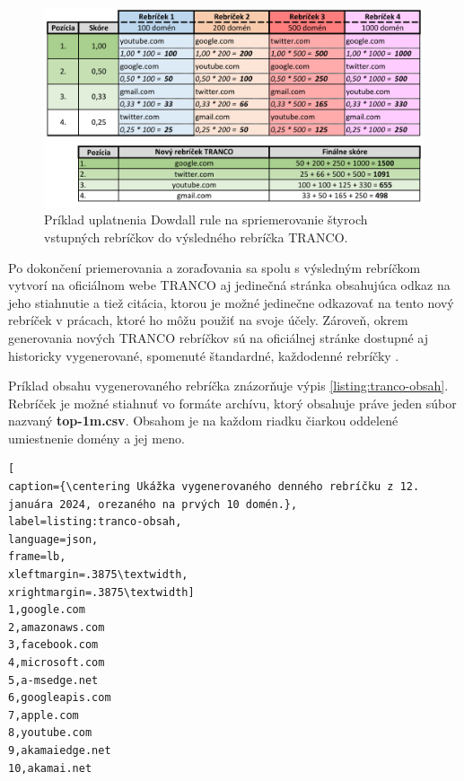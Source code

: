 \begin{figure}[htb]
\begin{center}
 \includegraphics[scale=0.84]{obrazky-figures/dowdall_rule_size_fit_cropped.pdf}
 \caption{\centering Príklad uplatnenia Dowdall rule na spriemerovanie štyroch vstupných rebríčkov do výsledného rebríčka TRANCO.}
 \label{img:dowdall-rule}
\end{center}
\end{figure}

Po dokončení priemerovania a zoraďovania sa spolu s výsledným rebríčkom vytvorí na oficiálnom webe TRANCO aj jedinečná stránka obsahujúca odkaz na jeho stiahnutie a tiež citácia, 
ktorou je možné jedinečne odkazovať na tento nový rebríček v prácach, ktoré ho môžu použiť na svoje účely.
Zároveň, okrem generovania nových TRANCO rebríčkov sú na oficiálnej stránke dostupné aj historicky vygenerované, spomenuté štandardné, každodenné rebríčky \cite{tranco-homepage}.

Príklad obsahu vygenerovaného rebríčka znázorňuje výpis \ref{listing:tranco-obsah}.
Rebríček je možné stiahnuť vo formáte  archívu, ktorý obsahuje práve jeden súbor nazvaný \textbf{top-1m.csv}. 
Obsahom je na každom riadku čiarkou oddelené umiestnenie domény a jej meno.

\pagebreak

\begin{center}
\centering
\begin{lstlisting}[
caption={\centering Ukážka vygenerovaného denného rebríčku z 12. januára 2024, orezaného na prvých 10 domén.},
label=listing:tranco-obsah, 
language=json, 
frame=lb,
xleftmargin=.3875\textwidth, 
xrightmargin=.3875\textwidth]
1,google.com
2,amazonaws.com
3,facebook.com
4,microsoft.com
5,a-msedge.net
6,googleapis.com
7,apple.com
8,youtube.com
9,akamaiedge.net
10,akamai.net

\end{lstlisting}
\end{center}

